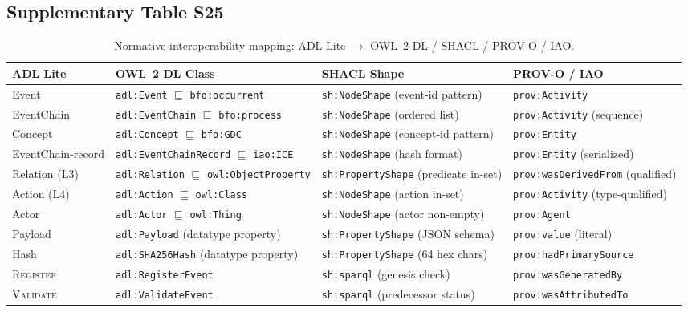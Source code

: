 \subsection{Supplementary Table S25}\label{tab:S25}
\begin{table}[htbp]
\centering
\footnotesize
\caption{Normative interoperability mapping: ADL Lite $\to$ OWL~2 DL / SHACL / PROV-O / IAO.}
\label{tab:interoperability-mapping}
\begin{tabularx}{\textwidth}{@{}p{2.8cm}p{2.8cm}p{3.2cm}p{3.2cm}@{}}
\toprule
\textbf{ADL Lite} & \textbf{OWL~2 DL Class} & \textbf{SHACL Shape} & \textbf{PROV-O / IAO} \\
\midrule
Event & \texttt{adl:Event} $\sqsubseteq$ \texttt{bfo:occurrent} & \texttt{sh:NodeShape} (event-id pattern) & \texttt{prov:Activity} \\
EventChain & \texttt{adl:EventChain} $\sqsubseteq$ \texttt{bfo:process} & \texttt{sh:NodeShape} (ordered list) & \texttt{prov:Activity} (sequence) \\
Concept & \texttt{adl:Concept} $\sqsubseteq$ \texttt{bfo:GDC} & \texttt{sh:NodeShape} (concept-id pattern) & \texttt{prov:Entity} \\
EventChain-record & \texttt{adl:EventChainRecord} $\sqsubseteq$ \texttt{iao:ICE} & \texttt{sh:NodeShape} (hash format) & \texttt{prov:Entity} (serialized) \\
Relation (L3) & \texttt{adl:Relation} $\sqsubseteq$ \texttt{owl:ObjectProperty} & \texttt{sh:PropertyShape} (predicate in-set) & \texttt{prov:wasDerivedFrom} (qualified) \\
Action (L4) & \texttt{adl:Action} $\sqsubseteq$ \texttt{owl:Class} & \texttt{sh:NodeShape} (action in-set) & \texttt{prov:Activity} (type-qualified) \\
Actor & \texttt{adl:Actor} $\sqsubseteq$ \texttt{owl:Thing} & \texttt{sh:NodeShape} (actor non-empty) & \texttt{prov:Agent} \\
Payload & \texttt{adl:Payload} (datatype property) & \texttt{sh:PropertyShape} (JSON schema) & \texttt{prov:value} (literal) \\
Hash & \texttt{adl:SHA256Hash} (datatype property) & \texttt{sh:PropertyShape} (64 hex chars) & \texttt{prov:hadPrimarySource} \\
\textsc{Register} & \texttt{adl:RegisterEvent} & \texttt{sh:sparql} (genesis check) & \texttt{prov:wasGeneratedBy} \\
\textsc{Validate} & \texttt{adl:ValidateEvent} & \texttt{sh:sparql} (predecessor status) & \texttt{prov:wasAttributedTo} \\

\end{tabularx}
\end{table}
